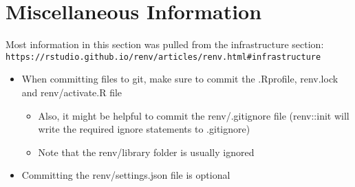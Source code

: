 \documentclass{article}
\begin{document}
\section{Miscellaneous Information}
Most information in this section was pulled from the infrastructure section: \verb|https://rstudio.github.io/renv/articles/renv.html#infrastructure|
\begin{itemize}
    \item When committing files to git, make sure to commit the .Rprofile, renv.lock and renv/activate.R file
    \begin{itemize}
        \item Also, it might be helpful to commit the renv/.gitignore file (renv::init will write the required ignore statements to .gitignore)
        \item Note that the renv/library folder is usually ignored
    \end{itemize}
    \item Committing the renv/settings.json file is optional
\end{itemize}
\end{document}
